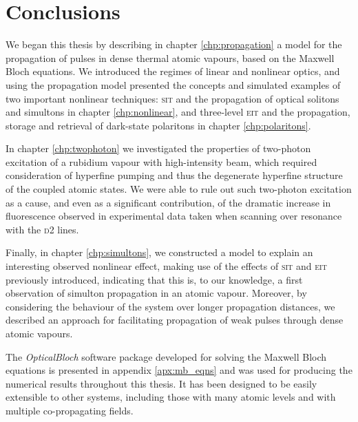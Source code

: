 \chapter[Conclusions]
  {Conclusions}
  \label{chp:conclusions}

  We began this thesis by describing in chapter \ref{chp:propagation} a model
  for the propagation of pulses in dense thermal atomic vapours, based on the
  Maxwell Bloch equations. We introduced the regimes of linear and nonlinear
  optics, and using the propagation model presented the concepts and simulated
  examples of two important nonlinear techniques: \textsc{sit} and the
  propagation of optical solitons and simultons in chapter \ref{chp:nonlinear},
  and three-level \textsc{eit} and the propagation, storage and retrieval of
  dark-state polaritons in chapter \ref{chp:polaritons}.

  In chapter \ref{chp:twophoton} we investigated the properties of two-photon
  excitation of a rubidium vapour with high-intensity beam, which required
  consideration of hyperfine pumping and thus the degenerate hyperfine structure
  of the coupled atomic states. We were able to rule out such two-photon
  excitation as a cause, and even as a significant contribution, of the dramatic
  increase in fluorescence observed in experimental data taken when scanning
  over resonance with the \textsc{d2} lines.

  Finally, in chapter \ref{chp:simultons}, we constructed a model to explain an
  interesting observed nonlinear effect, making use of the effects of
  \textsc{sit} and \textsc{eit} previously introduced, indicating that this is,
  to our knowledge, a first observation of simulton propagation in an atomic
  vapour. Moreover, by considering the behaviour of the system over longer
  propagation distances, we described an approach for facilitating propagation
  of weak pulses through dense atomic vapours.

  The \textit{OpticalBloch} software package developed for solving the Maxwell
  Bloch equations is presented in appendix \ref{apx:mb_eqns} and was used for
  producing the numerical results throughout this thesis. It has been designed
  to be easily extensible to other systems, including those with many atomic
  levels and with multiple co-propagating fields.

